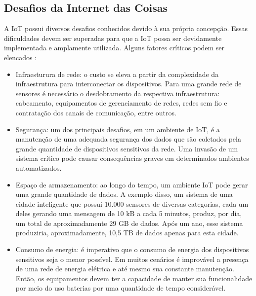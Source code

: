 
\subsection{Desafios da Internet das Coisas}
\label{subsec:desafios}
	\quad A \acrlong{IoT} possui diversos desafios conhecidos devido à sua própria concepção. Essas dificuldades devem ser superadas para que a
	\acrshort{IoT} possa ser devidamente implementada e amplamente utilizada. Alguns fatores críticos podem ser elencados \cite{roadmap}:
  \begin{itemize}
		\item Infraesturura de rede: o custo se eleva a partir da complexidade da infraestrutura para interconectar os dispositivos. Para uma grande rede de sensores é necessário o desdobramento da respectiva infraestrutura:
		 cabeamento, equipamentos de gerenciamento de redes, redes sem fio e contratação dos canais de comunicação, entre outros.

		\item Segurança: um dos principais desafios, em um ambiente de \acrlong{IoT}, é a manutenção de uma adequada segurança dos dados que são coletados pela grande quantidade de
		dispositivos sensitivos da rede. Uma invasão de um sistema crítico pode causar consequências graves em determinados ambientes automatizados.

	  \item Espaço de armazenamento: ao longo do tempo, um ambiente \acrshort{IoT} pode gerar uma grande quantidade de dados. A exemplo disso, um sistema de uma cidade inteligente que possui 10.000 sensores
 	  de diversas categorias, cada um deles gerando uma mensagem de 10 kB a cada 5 minutos, produz, por dia, um total de aproximadamente 29 GB de dados.
	  Após um ano, esse sistema produziria, aproximadamente, 10,5 TB de dados apenas para esta cidade.

		\item Consumo de energia: é imperativo que o consumo de energia dos dispositivos sensitivos seja o menor possível. Em muitos cenários é improvável a presença de uma
		rede de energia elétrica e até mesmo sua constante manutenção. Então, os equipamentos devem ter a capacidade de manter sua funcionalidade por meio do uso baterias por
		uma quantidade de tempo considerável.
\end{itemize}

